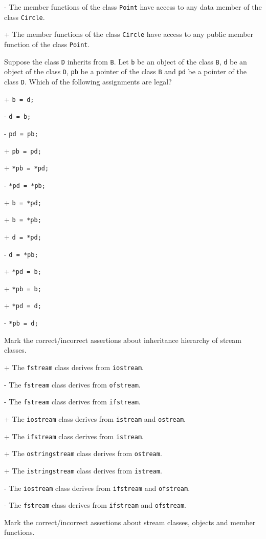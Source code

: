 - The member functions of the class \verb|Point| have access to any data member of the class \verb|Circle|.

+ The member functions of the class \verb|Circle| have access to any public member function of the class \verb|Point|.


\medskip
{}
Suppose the class \verb|D| inherits from \verb|B|. Let
\verb|b| be an object of the class \verb|B|,
\verb|d| be an object of the class \verb|D|,
\verb|pb| be a pointer of the class \verb|B| and
\verb|pd| be a pointer of the class \verb|D|.
Which of the following assignments are legal?

+ \verb|b = d;|

- \verb|d = b;|

- \verb|pd = pb;|

+ \verb|pb = pd;|

+ \verb|*pb = *pd;|

- \verb|*pd = *pb;|

+ \verb|b = *pd;|

+ \verb|b = *pb;|

+ \verb|d = *pd;|

- \verb|d = *pb;|

+ \verb|*pd = b;|

+ \verb|*pb = b;|

+ \verb|*pd = d;|

- \verb|*pb = d;|


\medskip
{}
Mark the correct/incorrect assertions about inheritance
hierarchy of stream classes.

+ The \verb|fstream| class derives from \verb|iostream|.

- The \verb|fstream| class derives from \verb|ofstream|.

- The \verb|fstream| class derives from \verb|ifstream|.

+ The \verb|iostream| class derives from \verb|istream| and \verb|ostream|.

+ The \verb|ifstream| class derives from \verb|istream|.

+ The \verb|ostringstream| class derives from \verb|ostream|.

+ The \verb|istringstream| class derives from \verb|istream|.

- The \verb|iostream| class derives from \verb|ifstream| and \verb|ofstream|.

- The \verb|fstream| class derives from \verb|ifstream| and \verb|ofstream|.


\medskip
{}
Mark the correct/incorrect assertions about stream classes, objects and
member functions.

